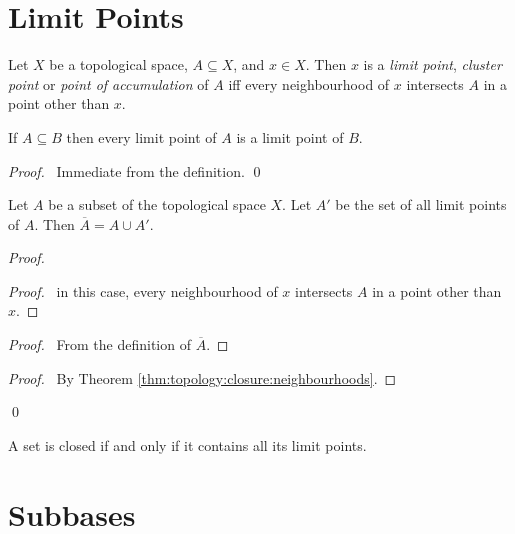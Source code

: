 \section{Limit Points}

\begin{df}
  Let $X$ be a topological space, $A \subseteq X$, and $x \in X$. Then $x$ is
  a
  \emph{limit point}, \emph{cluster point} or \emph{point of accumulation} of
  $A$ iff every neighbourhood of $x$ intersects $A$ in a point other than $x$.
\end{df}

\begin{lm}
  \label{lm:topology:limit_point:subset}
  If $A \subseteq B$ then every limit point of $A$ is a limit point of $B$.
\end{lm}

\begin{proof}
  \pf\ Immediate from the definition. \qed
\end{proof}

\begin{thm}
  Let $A$ be a subset of the topological space $X$. Let $A'$ be the set of
  all
  limit points of $A$. Then $\overline{A} = A \cup A'$.
\end{thm}

\begin{proof}
  \pf
  \begin{proof}
    \pf\ in this case, every neighbourhood of $x$ intersects $A$ in a point
    other than $x$.
  \end{proof}
  \begin{proof}
    \pf\ From the definition of $\overline{A}$.
  \end{proof}
  \begin{proof}
    \pf\ By Theorem \ref{thm:topology:closure:neighbourhoods}.
  \end{proof}
  \qed
\end{proof}

\begin{cor}
  \label{cor:topology:limit_point:closed}
  A set is closed if and only if it contains all its limit points.
\end{cor}

\section{Subbases}

